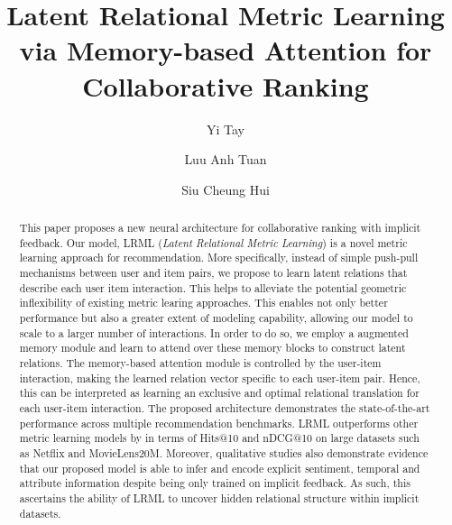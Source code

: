 \documentclass[sigconf]{acmart}
\begin{document}
\acmPrice{}

\title{Latent Relational Metric Learning via Memory-based Attention for Collaborative Ranking} 


\author{Yi Tay}

\author{Luu Anh Tuan}


\author{Siu Cheung Hui}


\begin{abstract}
This paper proposes a new neural architecture for collaborative ranking with implicit feedback. Our model, LRML (\textit{Latent Relational Metric Learning}) is a novel metric learning approach for recommendation. More specifically, instead of simple push-pull mechanisms between user and item pairs, we propose to learn latent relations that describe each user item interaction. This helps to alleviate the potential geometric inflexibility of existing metric learing approaches. This enables not only better performance but also a greater extent of modeling capability, allowing our model to scale to a larger number of interactions. In order to do so, we employ a augmented memory module and learn to attend over these memory blocks to construct latent relations. The memory-based attention module is controlled by the user-item interaction, making the learned relation vector specific to each user-item pair. Hence, this can be interpreted as learning an exclusive and optimal relational translation for each user-item interaction. The proposed architecture demonstrates the state-of-the-art performance across multiple recommendation benchmarks. LRML outperforms other metric learning models by  in terms of Hits@10 and nDCG@10 on large datasets such as Netflix and MovieLens20M. Moreover, qualitative studies also demonstrate evidence that our proposed model is able to infer and encode explicit sentiment, temporal and attribute information despite being only trained on implicit feedback. As such, this ascertains the ability of LRML to uncover hidden relational structure within implicit datasets. 

\end{abstract}
\end{document}
